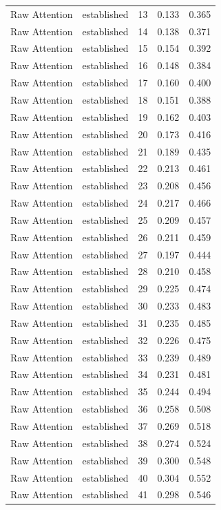 \begin{tabular}{llrrr}
Raw Attention & established & 13 & 0.133 & 0.365 \\
Raw Attention & established & 14 & 0.138 & 0.371 \\
Raw Attention & established & 15 & 0.154 & 0.392 \\
Raw Attention & established & 16 & 0.148 & 0.384 \\
Raw Attention & established & 17 & 0.160 & 0.400 \\
Raw Attention & established & 18 & 0.151 & 0.388 \\
Raw Attention & established & 19 & 0.162 & 0.403 \\
Raw Attention & established & 20 & 0.173 & 0.416 \\
Raw Attention & established & 21 & 0.189 & 0.435 \\
Raw Attention & established & 22 & 0.213 & 0.461 \\
Raw Attention & established & 23 & 0.208 & 0.456 \\
Raw Attention & established & 24 & 0.217 & 0.466 \\
Raw Attention & established & 25 & 0.209 & 0.457 \\
Raw Attention & established & 26 & 0.211 & 0.459 \\
Raw Attention & established & 27 & 0.197 & 0.444 \\
Raw Attention & established & 28 & 0.210 & 0.458 \\
Raw Attention & established & 29 & 0.225 & 0.474 \\
Raw Attention & established & 30 & 0.233 & 0.483 \\
Raw Attention & established & 31 & 0.235 & 0.485 \\
Raw Attention & established & 32 & 0.226 & 0.475 \\
Raw Attention & established & 33 & 0.239 & 0.489 \\
Raw Attention & established & 34 & 0.231 & 0.481 \\
Raw Attention & established & 35 & 0.244 & 0.494 \\
Raw Attention & established & 36 & 0.258 & 0.508 \\
Raw Attention & established & 37 & 0.269 & 0.518 \\
Raw Attention & established & 38 & 0.274 & 0.524 \\
Raw Attention & established & 39 & 0.300 & 0.548 \\
Raw Attention & established & 40 & 0.304 & 0.552 \\
Raw Attention & established & 41 & 0.298 & 0.546 \\

\end{tabular}
